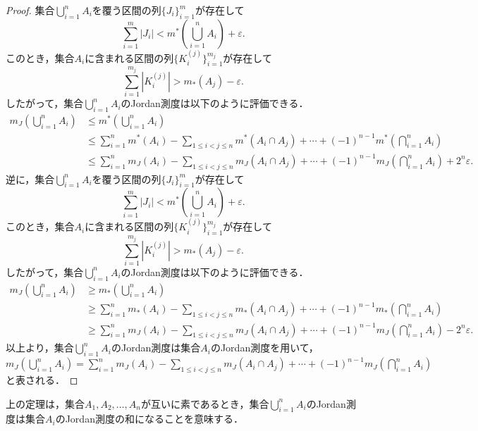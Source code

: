 \begin{proof}
    集合$\bigcup_{i=1}^n A_i$を覆う区間の列$\{J_i\}_{i=1}^m$が存在して
    \[\sum_{i=1}^m |J_i| < m^*\left( \bigcup_{i=1}^n A_i \right) + \varepsilon.\]
    このとき，集合$A_i$に含まれる区間の列$\{K_i^{(j)}\}_{i=1}^{m_j}$が存在して  
    \[\sum_{i=1}^{m_j} |K_i^{(j)}| > m_*(A_j) - \varepsilon.\]
    したがって，集合$\bigcup_{i=1}^n A_i$のJordan測度は以下のように評価できる．
    \begin{align*}
        m_J\left( \bigcup_{i=1}^n A_i \right) &\le m^*\left( \bigcup_{i=1}^n A_i \right) \\
        &\le \sum_{i=1}^n m^*(A_i) - \sum_{1 \le i < j \le n} m^*(A_i \cap A_j) + \cdots + (-1)^{n-1} m^*\left( \bigcap_{i=1}^n A_i \right) \\
        &\le \sum_{i=1}^n m_J(A_i) - \sum_{1 \le i < j \le n} m_J(A_i \cap A_j) + \cdots + (-1)^{n-1} m_J\left( \bigcap_{i=1}^n A_i \right) + 2^n \varepsilon.
    \end{align*}
    逆に，集合$\bigcup_{i=1}^n A_i$を覆う区間の列$\{J_i\}_{i=1}^m$が存在して
    \[\sum_{i=1}^m |J_i| < m^*\left( \bigcup_{i=1}^n A_i \right) + \varepsilon.\]
    このとき，集合$A_i$に含まれる区間の列$\{K_i^{(j)}\}_{i=1}^{m_j}$が存在して  
    \[\sum_{i=1}^{m_j} |K_i^{(j)}| > m_*(A_j) - \varepsilon.\]
    したがって，集合$\bigcup_{i=1}^n A_i$のJordan測度は以下のように評価できる．
    \begin{align*}
        m_J\left( \bigcup_{i=1}^n A_i \right) &\ge m_*\left( \bigcup_{i=1}^n A_i \right) \\
        &\ge \sum_{i=1}^n m_*(A_i) - \sum_{1 \le i < j \le n} m_*(A_i \cap A_j) + \cdots + (-1)^{n-1} m_*\left( \bigcap_{i=1}^n A_i \right) \\
        &\ge \sum_{i=1}^n m_J(A_i) - \sum_{1 \le i < j \le n} m_J(A_i \cap A_j) + \cdots + (-1)^{n-1} m_J\left( \bigcap_{i=1}^n A_i \right) - 2^n \varepsilon.
    \end{align*}
    以上より，集合$\bigcup_{i=1}^n A_i$のJordan測度は集合$A_i$のJordan測度を用いて，$m_J\left( \bigcup_{i=1}^n A_i \right) = \sum_{i=1}^n m_J(A_i) - \sum_{1 \le i < j \le n} m_J(A_i \cap A_j) + \cdots + (-1)^{n-1} m_J\left( \bigcap_{i=1}^n A_i \right)$と表される．
\end{proof}
\begin{remark}
    上の定理は，集合$A_1, A_2, \ldots, A_n$が互いに素であるとき，集合$\bigcup_{i=1}^n A_i$のJordan測度は集合$A_i$のJordan測度の和になることを意味する．
\end{remark}


